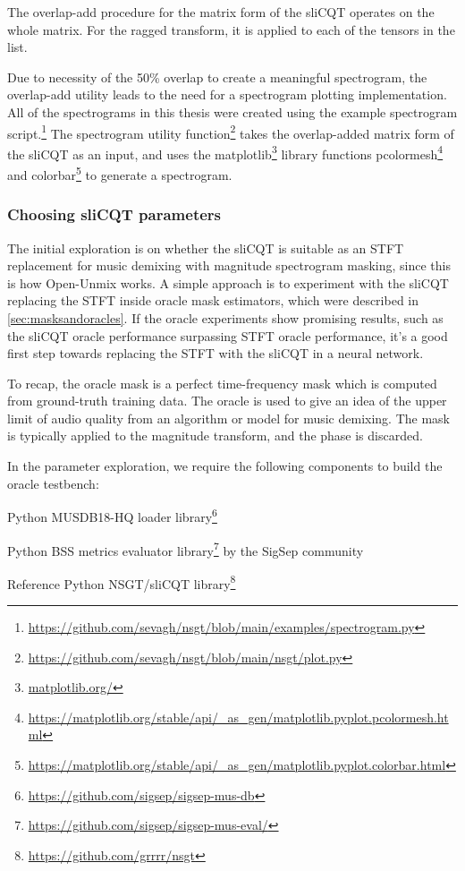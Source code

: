 \documentclass[report.tex]{subfiles}
\begin{document}
The overlap-add procedure for the matrix form of the sliCQT operates on the whole matrix. For the ragged transform, it is applied to each of the tensors in the list.

Due to necessity of the 50\% overlap to create a meaningful spectrogram, the overlap-add utility leads to the need for a spectrogram plotting implementation. All of the spectrograms in this thesis were created using the example spectrogram script.\footnote{\url{https://github.com/sevagh/nsgt/blob/main/examples/spectrogram.py}} The spectrogram utility function\footnote{\url{https://github.com/sevagh/nsgt/blob/main/nsgt/plot.py}} takes the overlap-added matrix form of the sliCQT as an input, and uses the matplotlib\footnote{\url{matplotlib.org/}} library functions pcolormesh\footnote{\url{https://matplotlib.org/stable/api/_as_gen/matplotlib.pyplot.pcolormesh.html}} and colorbar\footnote{\url{https://matplotlib.org/stable/api/_as_gen/matplotlib.pyplot.colorbar.html}} to generate a spectrogram.

\newpagefill

\subsubsection{Choosing sliCQT parameters}
\label{sec:slicqparamsrch}

The initial exploration is on whether the sliCQT is suitable as an STFT replacement for music demixing with magnitude spectrogram masking, since this is how Open-Unmix works. A simple approach is to experiment with the sliCQT replacing the STFT inside oracle mask estimators, which were described in \ref{sec:masksandoracles}. If the oracle experiments show promising results, such as the sliCQT oracle performance surpassing STFT oracle performance, it's a good first step towards replacing the STFT with the sliCQT in a neural network.

To recap, the oracle mask is a perfect time-frequency mask which is computed from ground-truth training data. The oracle is used to give an idea of the upper limit of audio quality from an algorithm or model for music demixing. The mask is typically applied to the magnitude transform, and the phase is discarded.

In the parameter exploration, we require the following components to build the oracle testbench:

\begin{tight_enumerate}
	\item
		Python MUSDB18-HQ loader library\footnote{\url{https://github.com/sigsep/sigsep-mus-db}}
	\item
		Python BSS metrics evaluator library\footnote{\url{https://github.com/sigsep/sigsep-mus-eval/}} by the SigSep community
	\item
		Reference Python NSGT/sliCQT library\footnote{\url{https://github.com/grrrr/nsgt}}
\end{tight_enumerate}
\end{document}
